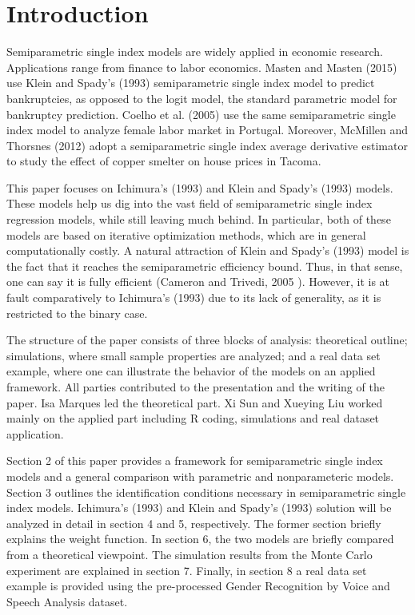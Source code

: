 \documentclass[a4paper]{article}
\begin{document}
\section{Introduction} %
\label{sec:introduction}

Semiparametric single index models are widely applied in economic research. Applications range from finance to labor economics. Masten and Masten (2015) \cite{[30]} use Klein and Spady's (1993) \cite{[12]} semiparametric single index model to predict bankruptcies, as opposed to the logit model, the standard parametric model for bankruptcy prediction. Coelho et al. (2005) \cite{[29]} use the same semiparametric single index model to analyze female labor market in Portugal. Moreover, McMillen and Thorsnes (2012) \cite{[31]} adopt a semiparametric single index average derivative estimator to study the effect of copper smelter on house prices in Tacoma.

This paper focuses on Ichimura's (1993) \cite{[6]} and Klein and Spady's (1993) \cite{[12]} models. These models help us dig into the vast field of semiparametric single index regression models, while still leaving much behind. In particular, both of these models are based on iterative optimization methods, which are in general computationally costly. A natural attraction of Klein and Spady's (1993) \citep{[12]} model is the fact that it reaches the semiparametric efficiency bound. Thus, in that sense, one can say it is fully efficient  (Cameron and Trivedi, 2005 \cite{[5]}). However, it is at fault comparatively to Ichimura's (1993) \cite{[6]} due to its lack of generality, as it is restricted to the binary case.

The structure of the paper consists of three blocks of analysis: theoretical outline; simulations, where small sample properties are analyzed; and a real data set example, where one can illustrate the behavior of the models on an applied framework. All parties contributed to the presentation and the writing of the paper. Isa Marques led the theoretical part. Xi Sun and Xueying Liu worked mainly on the applied part including R coding, simulations and real dataset application.


Section 2 of this paper provides a framework for semiparametric single index models and a general comparison with parametric and nonparameteric models. Section 3 outlines the identification conditions necessary in semiparametric single index models. Ichimura's (1993) \citep{[6]} and Klein and Spady's (1993) \citep{[12]} solution will be analyzed in detail in section 4 and 5, respectively. The former section briefly explains the weight function. In section 6, the two models are briefly compared from a theoretical viewpoint. The simulation results from the Monte Carlo experiment are explained in section 7. Finally, in section 8 a real data set example is provided using the pre-processed Gender Recognition by Voice and Speech Analysis dataset.
\end{document}
